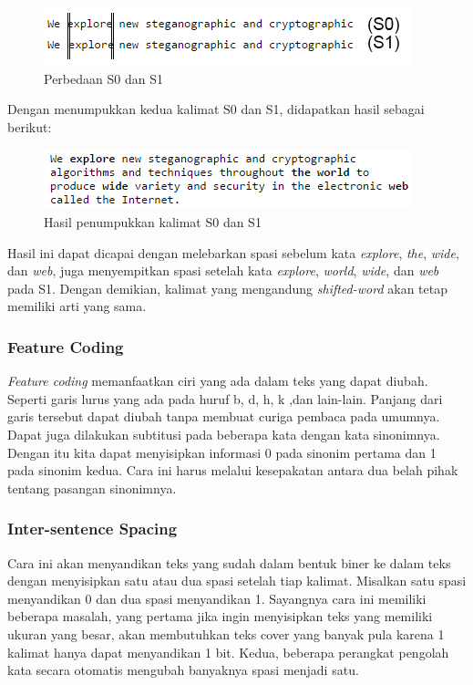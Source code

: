 \begin{figure}[H]
	\centering
	\includegraphics[scale=1.6]{Gambar/perbandingan-s0-s1}
	\caption{Perbedaan S0 dan S1}
\end{figure}

Dengan menumpukkan kedua kalimat S0 dan S1, didapatkan hasil sebagai berikut:

\begin{figure}[H]
	\centering
	\includegraphics[scale=0.8]{Gambar/overlap-result}
	\caption{Hasil penumpukkan kalimat S0 dan S1}
\end{figure}


Hasil ini dapat dicapai dengan melebarkan spasi sebelum kata \textit{explore}, \textit{the}, \textit{wide}, dan \textit{web}, juga menyempitkan spasi setelah kata \textit{explore}, \textit{world}, \textit{wide}, dan \textit{web} pada S1. Dengan demikian, kalimat yang mengandung \textit{shifted-word} akan tetap memiliki arti yang sama.

\subsubsection{Feature Coding}

\textit{Feature coding} memanfaatkan ciri yang ada dalam teks yang dapat diubah. Seperti garis lurus yang ada pada huruf b, d, h, k ,dan lain-lain. Panjang dari garis tersebut dapat diubah tanpa membuat curiga pembaca pada umumnya. Dapat juga dilakukan subtitusi pada beberapa kata dengan kata sinonimnya. Dengan itu kita dapat menyisipkan informasi 0 pada sinonim pertama dan 1 pada sinonim kedua. Cara ini harus melalui kesepakatan antara dua belah pihak tentang pasangan sinonimnya.

\subsubsection{Inter-sentence Spacing}

Cara ini akan menyandikan teks yang sudah dalam bentuk biner ke dalam teks dengan menyisipkan satu atau dua spasi setelah tiap kalimat. Misalkan satu spasi menyandikan 0 dan dua spasi menyandikan 1. Sayangnya cara ini memiliki beberapa masalah, yang pertama jika ingin menyisipkan teks yang memiliki ukuran yang besar, akan membutuhkan teks cover yang banyak pula karena 1 kalimat hanya dapat menyandikan 1 bit. Kedua, beberapa perangkat pengolah kata secara otomatis mengubah banyaknya spasi menjadi satu.

